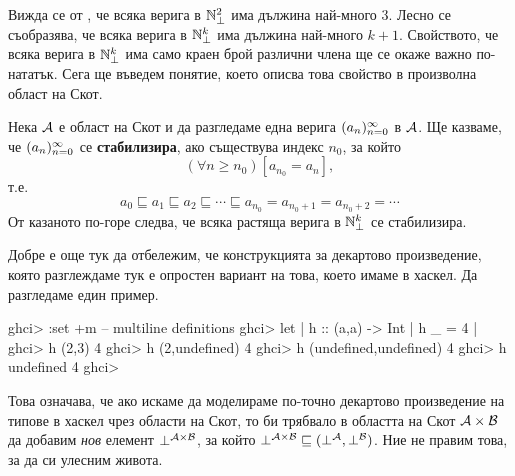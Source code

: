 Вижда се от , че всяка верига в $\mathbb{N}^2_\bot$ има дължина най-много $3$.
Лесно се съобразява, че всяка верига в $\mathbb{N}^k_\bot$ има дължина най-много $k+1$.
Свойството, че всяка верига в $\mathbb{N}^k_\bot$ има само краен брой различни члена
ще се окаже важно по-нататък. Сега ще въведем понятие, което описва това свойство в произволна област на Скот.

Нека $\mathcal{A}$ е област на Скот и да разгледаме една верига $(a_{n})^{\infty}_{n=0}$ в $\mathcal{A}$.
Ще казваме, че $(a_{n})^{\infty}_{n=0}$ се {\bf стабилизира}, ако съществува индекс $n_0$, за който
\[(\forall n \geq n_0)[a_{n_0} = a_{n}],\]
т.е.
\[a_0 \sqsubseteq a_1 \sqsubseteq a_2 \sqsubseteq \cdots \sqsubseteq a_{n_0} = a_{n_0+1} = a_{n_0+2} = \cdots\]
От казаното по-горе следва, че всяка растяща верига в $\mathbb{N}^k_\bot$ се стабилизира.



Добре е още тук да отбележим, че конструкцията за декартово произведение, която разглеждаме тук е опростен вариант на това, което имаме в хаскел.
Да разгледаме един пример.
\begin{haskellcode}
ghci> :set +m -- multiline definitions
ghci> let
 | h :: (a,a) -> Int
 | h _ = 4
 | 
ghci> h (2,3)
4
ghci> h (2,undefined)
4
ghci> h (undefined,undefined)
4
ghci> h undefined
4
ghci> 
\end{haskellcode}

Това означава, че ако искаме да моделираме по-точно декартово произведение на типове в хаскел чрез области на Скот, то би трябвало в областта на Скот $\mathcal{A} \times \mathcal{B}$
да добавим \emph{нов} елемент $\bot^{\mathcal{A}\times\mathcal{B}}$, за който $\bot^{\mathcal{A}\times\mathcal{B}} \sqsubseteq (\bot^{\mathcal{A}},\bot^{\mathcal{B}})$.
Ние не правим това, за да си улесним живота.

